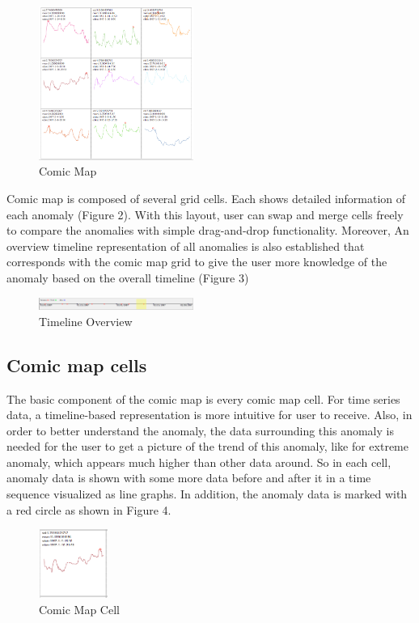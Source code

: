 \documentclass{vgtc}                          %
\begin{document}
\begin{figure}[htb]
	\centering
	\includegraphics[width=0.45\textwidth]{comicMap9Cell.jpg}
	\caption{Comic Map}
\end{figure}

Comic map is composed of several grid cells. Each shows detailed information of each anomaly (Figure 2). With this layout, user can swap and merge cells freely to compare the anomalies with simple drag-and-drop functionality. Moreover, An overview timeline representation of all anomalies is also established that corresponds with the comic map grid to give the user more knowledge of the anomaly based on the overall timeline (Figure 3)

\begin{figure}[htb]
	\centering
	\includegraphics[width=0.45\textwidth]{timeline.png}
	\caption{Timeline Overview}
\end{figure}

\subsection{Comic map cells}

The basic component of the comic map is every comic map cell. For time series data, a timeline-based representation is more intuitive for user to receive. Also, in order to better understand the anomaly, the data surrounding this anomaly is needed for the user to get a picture of the trend of this anomaly, like for extreme anomaly, which appears much higher than other data around. So in each cell, anomaly data is shown with some more data before and after it in a time sequence visualized as line graphs. In addition, the anomaly data is marked with a red circle as shown in Figure 4. 

\begin{figure}[htb]
	\centering
	\includegraphics[width=0.20\textwidth]{onecell.jpg}
	\caption{Comic Map Cell}
\end{figure}
\end{document}
